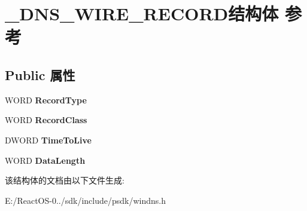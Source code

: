 \hypertarget{struct___d_n_s___w_i_r_e___r_e_c_o_r_d}{}\section{\+\_\+\+D\+N\+S\+\_\+\+W\+I\+R\+E\+\_\+\+R\+E\+C\+O\+R\+D结构体 参考}
\label{struct___d_n_s___w_i_r_e___r_e_c_o_r_d}
\subsection*{Public 属性}
\begin{DoxyCompactItemize}
\item 
\mbox{\label{struct___d_n_s___w_i_r_e___r_e_c_o_r_d_ad9cbe176779535b9003dd72bf5efea83}} 
W\+O\+RD {\bfseries Record\+Type}
\item 
\mbox{\label{struct___d_n_s___w_i_r_e___r_e_c_o_r_d_a2f1e8ebf67bf905718e843e34876fff7}} 
W\+O\+RD {\bfseries Record\+Class}
\item 
\mbox{\label{struct___d_n_s___w_i_r_e___r_e_c_o_r_d_a2e675abd3f2c9bcf20e18b98637829b5}} 
D\+W\+O\+RD {\bfseries Time\+To\+Live}
\item 
\mbox{\label{struct___d_n_s___w_i_r_e___r_e_c_o_r_d_a97d162a2e90f6da6fe616f3e439773fb}} 
W\+O\+RD {\bfseries Data\+Length}
\end{DoxyCompactItemize}


该结构体的文档由以下文件生成\+:\begin{DoxyCompactItemize}
\item 
E\+:/\+React\+O\+S-\/0../sdk/include/psdk/windns.\+h\end{DoxyCompactItemize}
